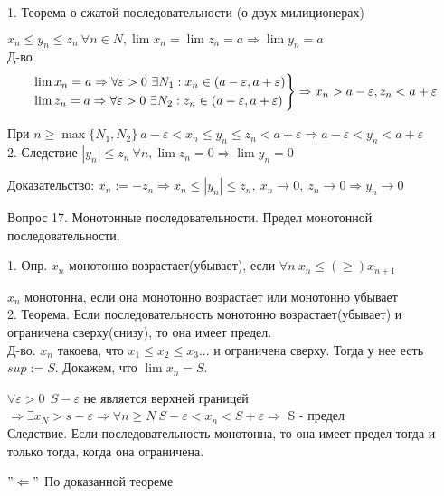 \documentclass[12pt]{article}
\begin{document}
1. Теорема о сжатой последовательности (о двух милиционерах)

$x_n \leq y_n \leq z_n\ \forall n\in N, \lim x_n = \lim z_n = a \Rightarrow \lim y_n = a$\\

Д-во
\[
\begin{drcases}
\lim x_n = a \Rightarrow \forall \varepsilon>0\ \exists N_1: x_n\in (a-\varepsilon, a+\varepsilon)\\
\lim z_n = a \Rightarrow \forall \varepsilon>0\  \exists N_2: z_n\in (a-\varepsilon, a+\varepsilon)
\end{drcases}
\Rightarrow x_n > a-\varepsilon, z_n<a+\varepsilon 
\]

При $n\geq \max\{N_1, N_2\}\ a-\varepsilon<x_n\leq y_n \leq z_n<a+\varepsilon \Rightarrow a-\varepsilon<y_n<a+\varepsilon$\\

2. Следствие $|y_n|\leq z_n\ \forall n, \lim z_n = 0 \Rightarrow \lim y_n = 0$

Доказательство: $x_n:=-z_n \Rightarrow x_n \leq |y_n| \leq z_n,\ x_n \to 0,\ z_n \to 0 \Rightarrow y_n \to 0$
\newpage

\begin{center}
Вопрос 17. Монотонные последовательности. Предел монотонной последовательности.
\end{center}

1. Опр. $x_n$ монотонно возрастает(убывает), если $\forall n\ x_n\leq(\geq ) x_{n+1}$

$x_n$ монотонна, если она монотонно возрастает или монотонно убывает\\

2. Теорема. Если последовательность монотонно возрастает(убывает) и ограничена сверху(снизу), то она имеет предел.\\

Д-во. $x_n$ такоева, что $x_1\leq x_2\leq x_3...$ и ограничена сверху. Тогда у нее есть $sup:=S$. Докажем, что $\lim x_n = S$.

$\forall \varepsilon>0\ \ S-\varepsilon$ не является верхней границей $\Rightarrow \exists x_N>s-\varepsilon \Rightarrow \forall n\geq N\ S-\varepsilon < x_n < S+\varepsilon \Rightarrow$ S - предел\\

Следствие. Если последовательность монотонна, то она имеет предел тогда и только тогда, когда она ограничена.

$"\Leftarrow"$ По доказанной теореме
\end{document}
